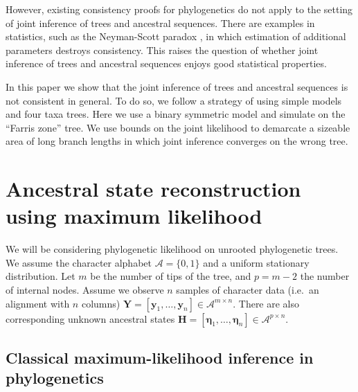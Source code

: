 \documentclass[a4paper]{article}
\newcommand{\alphabet}{\mathcal{A}}
\newcommand{\fullAlignment}{\mathbf{Y}}
\newcommand{\alignmentColumn}{\mathbf{y}}
\newcommand{\fullAncestralStates}{\mathbf{H}}
\newcommand{\ancestralStateColumn}{\boldsymbol\eta}
\newcommand{\nCols}{n}
\newcommand{\nSiteRows}{m}
\newcommand{\nAncestralStateRows}{p}
\begin{document}
However, existing consistency proofs for phylogenetics \cite{RoyChoudhury2015-ta} do not apply to the setting of joint inference of trees and ancestral sequences.
There are examples in statistics, such as the Neyman-Scott paradox \cite{Neyman1948-tt}, in which estimation of additional parameters destroys consistency.
This raises the question of whether joint inference of trees and ancestral sequences enjoys good statistical properties.

In this paper we show that the joint inference of trees and ancestral sequences is not consistent in general.
To do so, we follow a strategy of using simple models and four taxa trees.
Here we use a binary symmetric model and simulate on the ``Farris zone'' \cite{Siddall1998-hq} tree.
We use bounds on the joint likelihood to demarcate a sizeable area of long branch lengths in which joint inference converges on the wrong tree.

\section{Ancestral state reconstruction using maximum likelihood}

We will be considering phylogenetic likelihood on unrooted phylogenetic trees.
We assume the character alphabet $\alphabet=\{0,1\}$ and a uniform stationary distribution.
Let $\nSiteRows$ be the number of tips of the tree, and $\nAncestralStateRows = \nSiteRows-2$ the number of internal nodes.
Assume we observe $\nCols$ samples of character data (i.e.\ an alignment with $\nCols$ columns) $\fullAlignment=[\alignmentColumn_1,\ldots,\alignmentColumn_\nCols]\in\alphabet^{\nSiteRows\times\nCols}$.
There are also corresponding unknown ancestral states $\fullAncestralStates=[\ancestralStateColumn_1,\ldots,\ancestralStateColumn_\nCols]\in\alphabet^{\nAncestralStateRows\times\nCols}$.

\subsection{Classical maximum-likelihood inference in phylogenetics}
\end{document}
